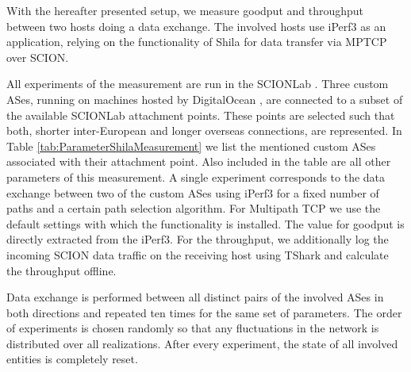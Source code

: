 With the hereafter presented setup, we measure goodput and throughput between two hosts doing a data exchange. The involved hosts use iPerf3 as an application, relying on the functionality of Shila for data transfer via MPTCP over SCION. 

All experiments of the measurement are run in the SCIONLab \cite{SCIOLab}. Three custom ASes, running on machines hosted by DigitalOcean \cite{DigitalOcean}, are connected to a subset of the available SCIONLab attachment points. These points are selected such that both, shorter inter-European and longer overseas connections, are represented. In Table \ref{tab:ParameterShilaMeasurement} we list the mentioned custom ASes associated with their attachment point. Also included in the table are all other parameters of this measurement. A single experiment corresponds to the data exchange between two of the custom ASes using iPerf3 for a fixed number of paths and a certain path selection algorithm. For Multipath TCP we use the default settings with which the functionality is installed. The value for goodput is directly extracted from the iPerf3. For the throughput, we additionally log the incoming SCION data traffic on the receiving host using TShark \cite{tshark} and calculate the throughput offline. 

Data exchange is performed between all distinct pairs of the involved ASes in both directions and repeated ten times for the same set of parameters. The order of experiments is chosen randomly so that any fluctuations in the network is distributed over all realizations. After every experiment, the state of all involved entities is completely reset.

